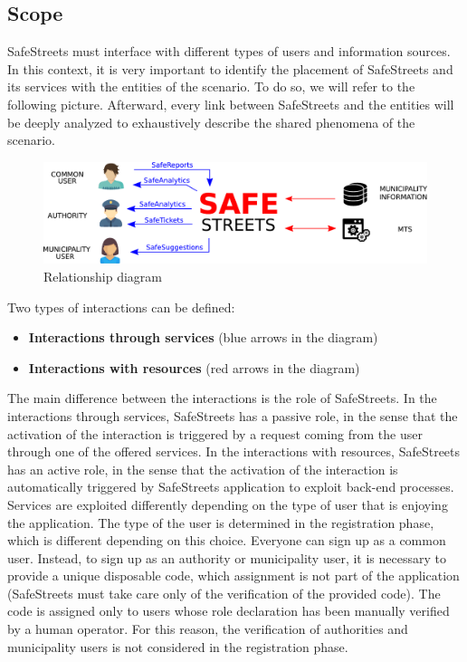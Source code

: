 \documentclass[a4paper]{article}
\begin{document}
\subsection{Scope}

SafeStreets must interface with different types of users and information
sources. In this context, it is very important to identify the placement
of SafeStreets and its services with the entities of the scenario. To do
so, we will refer to the following picture. Afterward, every link
between SafeStreets and the entities will be deeply analyzed to
exhaustively describe the shared phenomena of the scenario.

\begin{figure}[H]
\centering
\includegraphics[width=\textwidth]{relationship_diagram}
\caption{Relationship diagram}
\end{figure}

Two types of interactions can be defined:
\begin{itemize}
\item
  \textbf{Interactions through services} (blue arrows in the diagram)
\item
  \textbf{Interactions with resources} (red arrows in the diagram)
\end{itemize}

The main difference between the interactions is the role of SafeStreets.
In the interactions through services, SafeStreets has a
passive role, in the sense that the activation of the interaction is
triggered by a request coming from the user through one of the offered
services. In the interactions with resources, SafeStreets has an active
role, in the sense that the activation of the interaction is
automatically triggered by SafeStreets application to exploit back-end
processes.
\medskip\\
Services are exploited differently depending on the type of user that is
enjoying the application. The type of the user is determined in the
registration phase, which is different depending on this choice.
Everyone can sign up as a common user. Instead, to sign up as an
authority or municipality user, it is necessary to provide a unique
disposable code, which assignment is not part of the application
(SafeStreets must take care only of the verification of the provided
code). The code is assigned only to users whose role declaration has
been manually verified by a human operator. For this reason, the
verification of authorities and municipality users is not considered in
the registration phase.
\end{document}
